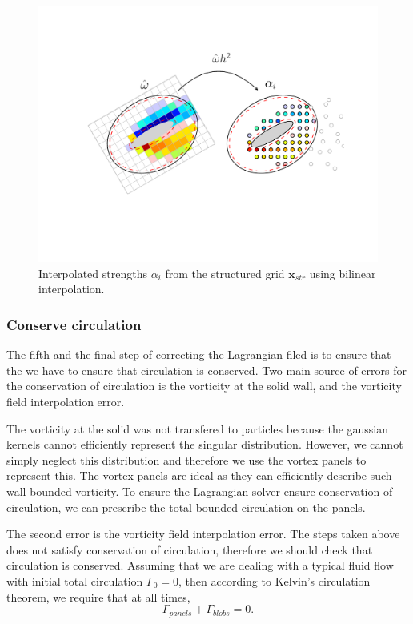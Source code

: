 	\begin{figure}[h]
	\centering
	\includegraphics[trim=2.55cm 3.35cm 2.05cm 2.5cm, clip, width=0.9\linewidth]{./figures/hybrid/interpolation/ellipse/interpolation_StructuredGrid2Blobs.pdf}
	\caption{Interpolated strengths $\alpha_i$ from the structured grid $\mathbf{x}_{str}$ using bilinear interpolation.}
	\label{fig:interpolation_StructuredGrid2Blobs}
	\end{figure}
	

\subsubsection*{Conserve circulation}

The fifth and the final step of correcting the Lagrangian filed is to ensure that the we have to ensure that circulation is conserved. Two main source of errors for the conservation of circulation is the vorticity at the solid wall, and the vorticity field interpolation error.

The vorticity at the solid was not transfered to particles because the gaussian kernels cannot efficiently represent the singular distribution. However, we cannot simply neglect this distribution and therefore we use the vortex panels to represent this. The vortex panels are ideal as they can efficiently describe such wall bounded vorticity. To ensure the Lagrangian solver ensure conservation of circulation, we can prescribe the total bounded circulation on the panels.

The second error is the vorticity field interpolation error. The steps taken above does not satisfy conservation of circulation, therefore we should check that circulation is conserved. Assuming that we are dealing with a typical fluid flow with initial total circulation $\Gamma_0 = 0$, then according to Kelvin's circulation theorem, we require that at all times,
\begin{equation}
\Gamma_{panels} + \Gamma_{blobs} = 0.
\end{equation}

